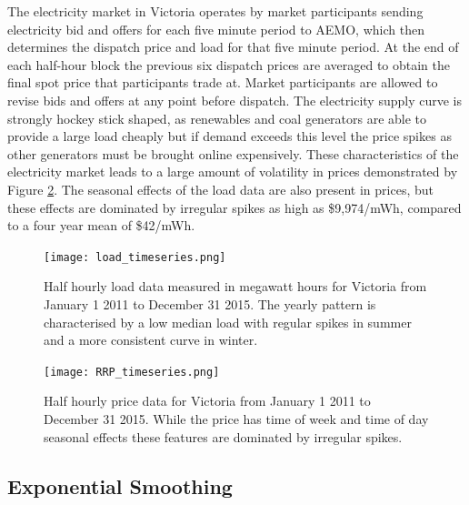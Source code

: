 \documentclass[12pt,a4paper]{article}%
\numberwithin{equation}{section}
\begin{document}
The electricity market in Victoria operates by market participants sending electricity bid and offers for each five minute period to AEMO, which then determines the dispatch price and load for that five minute period. At the end of each half-hour block the previous six dispatch prices are averaged to obtain the final spot price that participants trade at. Market participants are allowed to revise bids and offers at any point before dispatch. The electricity supply curve is strongly hockey stick shaped, as renewables and coal generators are able to provide a large load cheaply but if demand exceeds this level the price spikes as other generators must be brought online expensively. These characteristics of the electricity market leads to a large amount of volatility in prices demonstrated by Figure \ref{fig:rrpplot}. The seasonal effects of the load data are also present in prices, but these effects are dominated by irregular spikes as high as \$9,974/mWh, compared to a four year mean of \$42/mWh.

\begin{figure}[h]
\centering
\texttt{[image: load\_timeseries.png]}
\caption{Half hourly load data measured in megawatt hours for Victoria from January 1 2011 to December 31 2015. The yearly pattern is characterised by a low median load with regular spikes in summer and a more consistent curve in winter.}
\label{fig:loadplot}
\end{figure}

\begin{figure}[h]
\centering
\texttt{[image: RRP\_timeseries.png]}
\caption{Half hourly price data for Victoria from January 1 2011 to December 31 2015. While the price has time of week and time of day seasonal effects these features are dominated by irregular spikes.}
\label{fig:rrpplot}
\end{figure}

\subsection{Exponential Smoothing}
\end{document}
